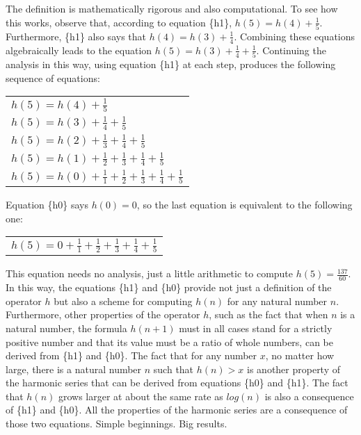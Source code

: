The definition is mathematically rigorous
and also computational.
To see how this works, observe that, according to equation \{h1\},
$h(5) = h(4)+\frac{1}{5}$.
Furthermore, \{h1\} also says that $h(4) = h(3)+\frac{1}{4}$.
Combining these equations algebraically leads to the equation
$h(5) = h(3)+\frac{1}{4}+\frac{1}{5}$.
Continuing the analysis in this way, using equation \{h1\} at each step,
produces the following sequence of equations:
\begin{center}
\begin{tabular}{l}
$h(5) = h(4) + \frac{1}{5}$ \\
$h(5) = h(3) + \frac{1}{4} + \frac{1}{5}$\\
$h(5) = h(2) + \frac{1}{3} + \frac{1}{4} + \frac{1}{5}$\\
$h(5) = h(1) + \frac{1}{2} + \frac{1}{3} + \frac{1}{4} + \frac{1}{5}$\\
$h(5) = h(0) + \frac{1}{1} + \frac{1}{2} + \frac{1}{3} + \frac{1}{4} + \frac{1}{5}$\\
\end{tabular}
\end{center}

Equation \{h0\} says $h(0) = 0$,
so the last equation is equivalent to the following one:
\begin{center}
\begin{tabular}{l}
$h(5) = 0 + \frac{1}{1} + \frac{1}{2} + \frac{1}{3} + \frac{1}{4} + \frac{1}{5}$\\
\end{tabular}
\end{center}

This equation needs no analysis, just a little arithmetic
to compute $h(5) = \frac{137}{60}$.
In this way, the equations \{h1\} and \{h0\} provide not just
a definition of the operator $h$ but also a scheme for computing $h(n)$
for any natural number $n$.
Furthermore, other properties of the operator $h$,
such as the fact that when $n$ is a natural number,
the formula $h(n+1)$ must in all cases stand for a strictly positive number
and that its value must be a ratio of whole numbers,
can be derived from \{h1\} and \{h0\}.
The fact that for any number $x$, no matter how large,
there is a natural number $n$ such that $h(n) > x$
is another property of the harmonic series that can be
derived from equations \{h0\} and \{h1\}.
The fact that $h(n)$ grows larger at about
the same rate as $log(n)$ is also a consequence
of \{h1\} and \{h0\}. All the properties of the
harmonic series are a consequence of those two equations.
Simple beginnings. Big results.


